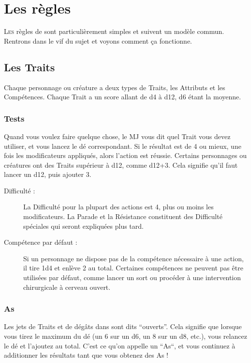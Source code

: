 
\section{Les règles}

\lettrine{L}{es} règles de \swr sont particulièrement simples et suivent un modèle commun. Rentrons dans le vif du sujet et voyons comment ça fonctionne.

\subsection{Les Traits}
Chaque personnage ou créature a deux types de Traits, les Attributs et les Compétences. Chaque Trait a un score allant de d4 à d12, d6 étant la moyenne.

\subsubsection{Tests}
Quand vous voulez faire quelque chose, le MJ vous dit quel Trait vous devez utiliser, et vous lancez le dé correspondant. Si le résultat est de 4 ou mieux, une fois les modificateurs appliqués, alors l’action est réussie. Certains personnages ou créatures ont des Traits supérieur à d12, comme d12+3. Cela signifie qu’il faut lancer un d12, puis ajouter 3.

\begin{description}
\item[Difficulté :] La Difficulté pour la plupart des actions est 4, plus ou moins les modificateurs. La Parade et la Résistance constituent des Difficulté spéciales qui seront expliquées plus tard.

\item[Compétence par défaut :] Si un personnage ne dispose pas de la compétence nécessaire à une action, il tire 1d4 et enlève 2 au total. Certaines compétences ne peuvent pas être utilisées par défaut, comme lancer un sort ou procéder à une intervention chirurgicale à cerveau ouvert.
\end{description}

\subsubsection{As}
Les jets de Traits et de dégâts dans \swr sont dits “ouverts”. Cela signifie que lorsque vous tirez le maximum du dé (un 6 sur un d6, un 8 sur un d8, etc.), vous relancez le dé et l’ajoutez au total. C’est ce qu’on appelle un “As“, et vous continuez à additionner les résultats tant que vous obtenez des As !

